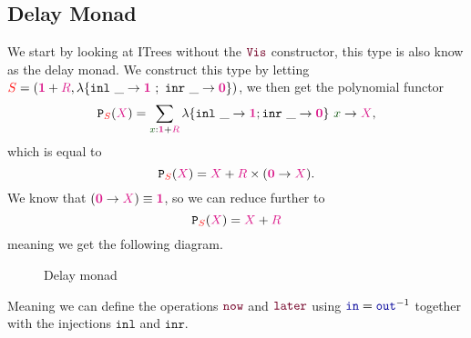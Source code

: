 \documentclass[twoside,11pt,openright]{report}
\theoremstyle{plain} %
\theoremstyle{definition}
\theoremstyle{remark}
\newcommand*{\term}[1]{\textcolor{green!30!black}{#1}} %
\newcommand*{\type}[1]{\textcolor{magenta!90!black}{#1}}
\newcommand*{\container}[1]{\textcolor{red}{#1}}
\newcommand*{\unit}{\type{\textbf{1}}}
\newcommand*{\empt}{\type{\textbf{0}}}
\newcommand*{\function}[1]{\textcolor{blue!60!black}{\ensuremath{\mathtt{#1}}}}
\newcommand*{\constructor}[1]{\textcolor{purple!60!black}{\ensuremath{\mathtt{#1}}}}
\newcommand*{\typeformer}[1]{\ensuremath{\mathtt{#1}}}
\newcommand*{\functor}[1]{\ensuremath{\mathbf{\mathtt{#1}}}}
\begin{document}
\subsection{Delay Monad}
We start by looking at ITrees without the \(\constructor{Vis}\) constructor, this type is also know as the delay monad. We construct this type by letting \(\container{S} = (\unit + \type{R},\lambda \{ \texttt{inl}~\_ \rightarrow \unit~;~\texttt{inr}~\_ \rightarrow \empt \})\), we then get the polynomial functor
\begin{equation}
  \functor{P}_{\container{S}}(\type{X}) = \sum_{\term{x} : \unit + \type{R}} \lambda \{ \texttt{inl}~\_ \rightarrow \unit ; \texttt{inr}~\_ \rightarrow \empt\}~\term{x} \rightarrow \type{X},
\end{equation}
which is equal to
\begin{equation}
  \functor{P}_{\container{S}}(\type{X}) = \type{X} + \type{R} \times (\empt \rightarrow \type{X}).
\end{equation}
We know that \((\empt \rightarrow \type{X}) \equiv \unit\), so we can reduce further to
\begin{equation}
  \functor{P}_{\container{S}}(\type{X}) = \type{X} + \type{R}
\end{equation}
meaning we get the following diagram.

\begin{figure}[h]
  \centering
  \caption{Delay monad}
\end{figure}
\noindent Meaning we can define the operations \(\constructor{now}\) and \(\constructor{later}\) using \(\function{in} = \function{out}^{-1}\) together with the injections \(\mathtt{inl}\) and \(\mathtt{inr}\). 
\end{document}
